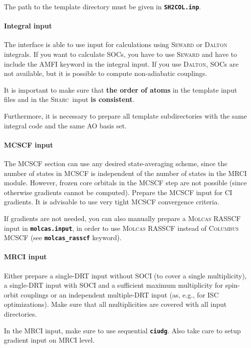 \documentclass[a4paper,11pt,DIV=15,openany,twoside=false]{scrbook}
\newcommand{\sharc}{\textsc{Sharc}}
\newcommand{\ttt}[1]{\textbf{\texttt{#1}}}
\begin{document}
The path to the template directory must be given in \ttt{SH2COL.inp}.

\paragraph{Integral input}

The interface is able to use input for calculations using \textsc{Seward} or \textsc{Dalton} integrals. 
If you want to calculate SOCs, you have to use \textsc{Seward} and have to include the AMFI keyword in the integral input.
If you use \textsc{Dalton}, SOCs are not available, but it is possible to compute non-adiabatic couplings.

It is important to make sure that \textbf{the order of atoms} in the template input files and in the \sharc\ input \textbf{is consistent}.

Furthermore, it is necessary to prepare all template subdirectories with the same integral code and the same AO basis set. 

\paragraph{MCSCF input}

The MCSCF section can use any desired state-averaging scheme, since the number of states in MCSCF is independent of the number of states in the MRCI module. However, frozen core orbitals in the MCSCF step are not possible (since otherwise gradients cannot be computed). Prepare the MCSCF input for CI gradients. It is advisable to use very tight MCSCF convergence criteria.

If gradients are not needed, you can also manually prepare a \textsc{Molcas} RASSCF input in \ttt{molcas.input}, in order to use \textsc{Molcas} RASSCF instead of \textsc{Columbus} MCSCF (see \ttt{molcas\_rasscf} keyword).

\paragraph{MRCI input}

Either prepare a single-DRT input without SOCI (to cover a single multiplicity), a single-DRT input with SOCI and a sufficient maximum multiplicity for spin-orbit couplings or an independent multiple-DRT input (as, e.g., for ISC optimizations). Make sure that all multiplicities are covered with all input directories.

In the MRCI input, make sure to use sequential \ttt{ciudg}. Also take care to setup gradient input on MRCI level.
\end{document}
